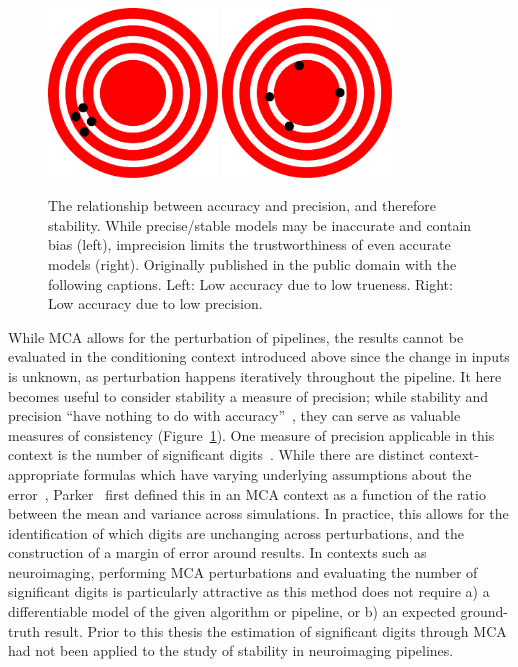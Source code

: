 \begin{figure}[b!]
\centering
\includegraphics[width=0.4\textwidth]{./figs/low_accuracy.pdf}
\includegraphics[width=0.4\textwidth]{./figs/low_precision.pdf}
\caption[Relationship between accuracy and precision]{The relationship between accuracy and precision, and therefore
stability. While precise/stable models may be inaccurate and contain bias (left), imprecision limits the trustworthiness
of even accurate models (right). Originally published in the public domain with the following captions. Left: Low accuracy due
to low trueness. Right: Low accuracy due to low precision.~\cite{accuracy_wiki}}
\label{fig:acc_pre}
\end{figure}

While MCA allows for the perturbation of pipelines, the results cannot be evaluated in the conditioning context
introduced above since the change in inputs is unknown, as perturbation happens iteratively throughout the pipeline. It
here becomes useful to consider stability a measure of precision; while stability and precision ``have nothing to do
with accuracy''~\cite{kiusalaas2013numerical}, they can serve as valuable measures of consistency
(Figure~\ref{fig:acc_pre}). One measure of precision applicable in this context is the number of significant
digits~\cite{Parker1997-qq}. While there are distinct context-appropriate formulas which have varying underlying
assumptions about the error~\cite{sohier2018confidence}, Parker~\cite{Parker1997-qq} first defined this in an MCA
context as a function of the ratio between the mean and variance across simulations. In practice, this allows for the
identification of which digits are unchanging across perturbations, and the construction of a margin of error around
results. In contexts such as neuroimaging, performing MCA perturbations and evaluating the number of significant digits
is particularly attractive as this method does not require a) a differentiable model of the given algorithm or pipeline,
or b) an expected ground-truth result. Prior to this thesis the estimation of significant digits through MCA had not been
applied to the study of stability in neuroimaging pipelines.


